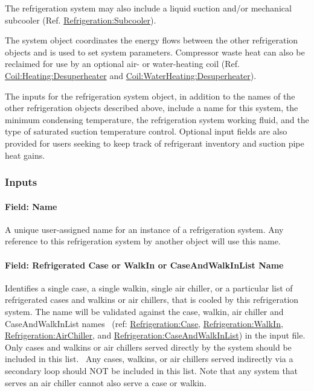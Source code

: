 The refrigeration system may also include a liquid suction and/or mechanical subcooler (Ref. \hyperref[refrigerationsubcooler]{Refrigeration:Subcooler}).

The system object coordinates the energy flows between the other refrigeration objects and is used to set system parameters. Compressor waste heat can also be reclaimed for use by an optional air- or water-heating coil (Ref. \hyperref[coilheatingdesuperheater]{Coil:Heating:Desuperheater} and \hyperref[coilwaterheatingdesuperheater]{Coil:WaterHeating:Desuperheater}).

The inputs for the refrigeration system object, in addition to the names of the other refrigeration objects described above, include a name for this system, the minimum condensing temperature, the refrigeration system working fluid, and the type of saturated suction temperature control. Optional input fields are also provided for users seeking to keep track of refrigerant inventory and suction pipe heat gains.

\subsubsection{Inputs}\label{inputs-3-029}

\paragraph{Field: Name}\label{field-name-4-023}

A unique user-assigned name for an instance of a refrigeration system. Any reference to this refrigeration system by another object will use this name.

\paragraph{Field: Refrigerated Case or WalkIn or CaseAndWalkInList Name}\label{field-refrigerated-case-or-walkin-or-caseandwalkinlist-name}

Identifies a single case, a single walkin, single air chiller, or a particular list of refrigerated cases and walkins or air chillers, that is cooled by this refrigeration system. The name will be validated against the case, walkin, air chiller and CaseAndWalkInList names ~(ref: \hyperref[refrigerationcase]{Refrigeration:Case}, \hyperref[refrigerationwalkin]{Refrigeration:WalkIn}, \hyperref[refrigerationairchiller]{Refrigeration:AirChiller}, and \hyperref[refrigerationcaseandwalkinlist]{Refrigeration:CaseAndWalkInList}) in the input file. Only cases and walkins or air chillers served directly by the system should be included in this list.~ Any cases, walkins, or air chillers served indirectly via a secondary loop should NOT be included in this list. Note that any system that serves an air chiller cannot also serve a case or walkin.

